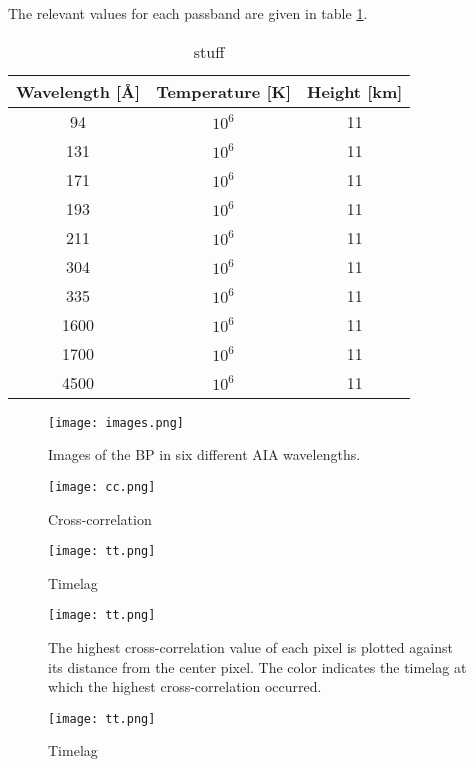 \documentclass[preprint2]{aastex}
\begin{document}
The relevant values for each passband are given in table \ref{aia}.
\begin{table}[h]
\centering
    \begin{tabular}{c c c}
        \hline\hline
        Wavelength [\AA{}] & Temperature [K] & Height [km]\\
        \hline
        94 & $10^{6}$ & 11\\
        131 & $10^{6}$ & 11\\
        171 & $10^{6}$ & 11\\
        193 & $10^{6}$ & 11\\
        211 & $10^{6}$ & 11\\
        304 & $10^{6}$ & 11\\
        335 & $10^{6}$ & 11\\
        1600 & $10^{6}$ & 11\\
        1700 & $10^{6}$ & 11\\
        4500 & $10^{6}$ & 11\\
    \end{tabular}
\caption{stuff}
\label{aia}
\end{table}

\begin{figure*}[htb!]
    \texttt{[image: images.png]}
    \caption{Images of the BP in six different AIA wavelengths.}
\end{figure*}

\begin{figure*}[htb!]
    \texttt{[image: cc.png]}
    \caption{Cross-correlation}
\end{figure*}

\begin{figure*}[htb!]
    \texttt{[image: tt.png]}
    \caption{Timelag}
\end{figure*}

\begin{figure*}[htb!]
    \texttt{[image: tt.png]}
    \caption{The highest cross-correlation value of each pixel is plotted against
        its distance from the center pixel. The color indicates the timelag at which
        the highest cross-correlation occurred.}
\end{figure*}

\begin{figure*}[htb!]
    \texttt{[image: tt.png]}
    \caption{Timelag}
\end{figure*}
\end{document}
